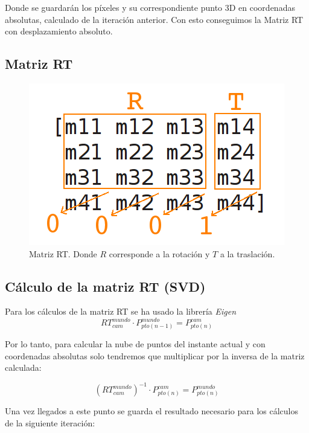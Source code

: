 Donde se guardarán los píxeles y su correspondiente punto 3D en coordenadas absolutas, calculado de la iteración anterior. Con esto conseguimos la Matriz RT con desplazamiento absoluto.

\subsection{Matriz RT}

\begin{figure}[th]
\centering
\includegraphics[scale=0.5]{Figures/matrixRT.png}
\decoRule
\caption[matrix-rt]{Matriz RT. Donde $R$ corresponde a la rotación y $T$ a la traslación.}
\label{fig:matrixRT}
\end{figure}



\subsection{Cálculo de la matriz RT (SVD)}

Para los cálculos de la matriz RT se ha usado la librería \textit{Eigen}
\begin{equation}
RT_{cam}^{mundo}\cdot P_{pto(n-1)}^{mundo}=P_{pto(n)}^{cam}
\end{equation}

Por lo tanto, para calcular la nube de puntos del instante actual y con coordenadas absolutas solo tendremos que multiplicar por la inversa de la matriz calculada:

\begin{equation}
\left(RT_{cam}^{mundo}\right)^{-1}\cdot P_{pto(n)}^{cam}=P_{pto(n)}^{mundo}
\end{equation}

Una vez llegados a este punto se guarda el resultado necesario para los cálculos de la siguiente iteración:

